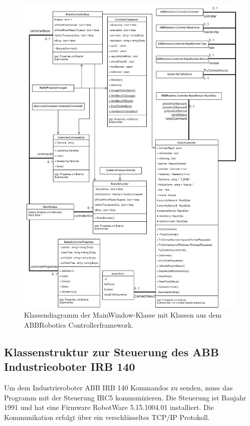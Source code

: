     \begin{figure}
        \caption[Klassendiagramm ABBRobotics Controller ]
        {\small Klassendiagramm der MainWindow-Klasse mit Klassen aus dem ABBRobotics Controllerframework. }\label{fig:figure3}
        \includegraphics[width = \textwidth ]{Bilder/LV_Klassendiagramm_ABBController}
        \centering
    \end{figure}

\subsection{Klassenstruktur zur Steuerung des ABB Industrieoboter IRB 140}\label{ABBKlassen}

Um dem Industrieroboter ABB IRB 140 Kommandos zu senden, muss das Programm mit der Steuerung IRC5 kommunizieren.
Die Steuerung ist Baujahr 1991 und hat eine Firmware \glqq RobotWare 5.15.1004.01\grqq{} installiert.
Die Kommunikation erfolgt über ein verschlüsseltes TCP/IP Protokoll. 

